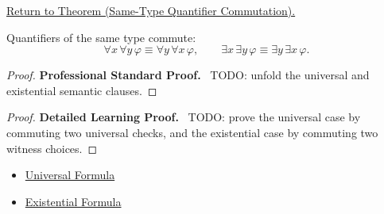 \newpage
{}
\label{prf:qcomm}

\begin{remark*}[Return]
\hyperref[thm:qcomm]{Return to Theorem (Same-Type Quantifier Commutation).}
\end{remark*}

\begin{theorem*}
Quantifiers of the same type commute:
\[
\forall x\,\forall y\,\varphi \equiv \forall y\,\forall x\,\varphi,
\qquad
\exists x\,\exists y\,\varphi \equiv \exists y\,\exists x\,\varphi.
\]
\end{theorem*}

\begin{proof}
\textbf{Professional Standard Proof.}~
TODO: unfold the universal and existential semantic clauses.
\end{proof}

\begin{proof}
\textbf{Detailed Learning Proof.}~
TODO: prove the universal case by commuting two universal checks, and the
existential case by commuting two witness choices.
\end{proof}

\begin{remark*}
\end{remark*}

\begin{dependencies}
\begin{itemize}
  \item \hyperref[def:universal-q]{Universal Formula}
  \item \hyperref[def:existential-q]{Existential Formula}
\end{itemize}
\end{dependencies}

\clearpage
